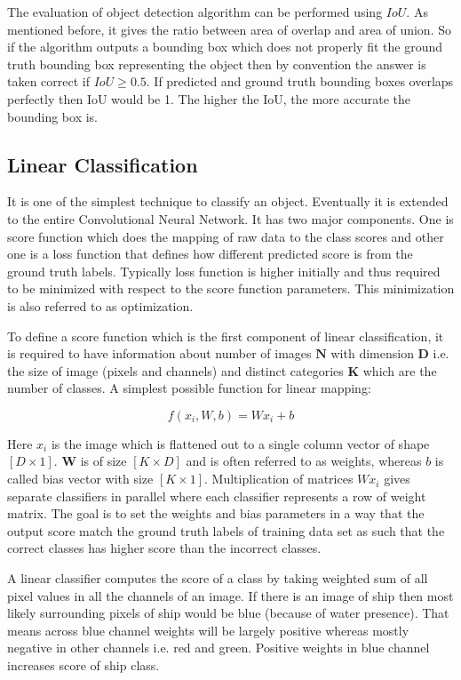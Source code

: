 \documentclass[11pt]{article}
\begin{document}
The evaluation of object detection algorithm can be performed using $IoU$. As mentioned before, it gives the ratio between area of overlap and area of union. So if the algorithm outputs a bounding box which does not properly fit the ground truth bounding box representing the object then by convention the answer is taken correct if $IoU \geq 0.5$. If predicted and ground truth bounding boxes overlaps perfectly then IoU would be 1. The higher the IoU, the more accurate the bounding box is.

\subsection{Linear Classification}
It is one of the simplest technique to classify an object. Eventually it is extended to the entire Convolutional Neural Network. It has two major components. One is score function which does the mapping of raw data to the class scores and other one is a loss function that defines how different predicted score is from the ground truth labels. Typically loss function is higher initially and thus required to be minimized with respect to the score function parameters. This minimization is also referred to as optimization. 

To define a score function which is the first component of linear classification, it is required to have information about number of images $\boldsymbol{N}$ with dimension  $\boldsymbol{D}$ i.e. the size of image (pixels and channels) and distinct categories $\boldsymbol{K}$ which are the number of classes. A simplest possible function for linear mapping:

$$
f(x_i, W, b) = Wx_i + b
$$

Here $x_i$ is the image which is flattened out to a single column vector of shape $[D \times 1]$. $\boldsymbol{W}$ is of size  $[K \times D]$ and is often referred to as weights, whereas $b$ is called bias vector with size  $[K \times 1]$. Multiplication of matrices $Wx_i$ gives separate classifiers in parallel where each classifier represents a row of weight matrix. The goal is to set the weights and bias parameters in a way that the output score match the ground truth labels of training data set as such that the correct classes has higher score than the incorrect classes.

A linear classifier computes the score of a class by taking weighted sum of all pixel values in all the channels of an image. If there is an image of ship then most likely surrounding pixels of ship would be blue (because of water presence). That means across blue channel weights will be largely positive whereas mostly negative in other channels i.e. red and green. Positive weights in blue channel increases score of ship class.
\end{document}
